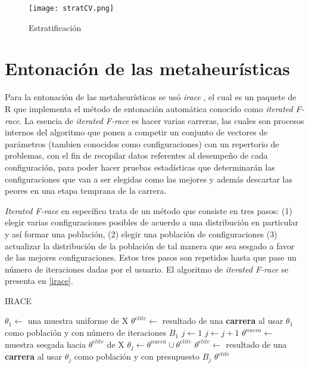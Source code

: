 \begin{figure}[]
\centering
\texttt{[image: stratCV.png]}
\caption[Estratificación]{Estratificación}
\label{strat}
\end{figure}

\section{Entonación de las metaheurísticas}

Para la entonación de las metaheurísticas se usó \emph{irace} \cite{lopez2016irace}, el cual es un paquete de R que implementa el método de entonación automática conocido como \emph{iterated F-race}. La esencia de \emph{iterated F-race}
es hacer varias carreras, las cuales son procesos internos del algoritmo que ponen a competir un conjunto de vectores de parámetros (tambien conocidos como configuraciones) con un repertorio de problemas, con el fin de recopilar datos referentes al desempeño de cada configuración, para poder hacer pruebas estadísticas que determinarán las configuraciones que van a ser elegidas como las mejores y además descartar las peores en una etapa temprana de la carrera. 

\emph{Iterated F-race} en específico trata de un método que consiste en tres pasos: (1) elegir varias configuraciones posibles de acuerdo a una distribución en particular y así formar una población, (2) elegir una población de configuraciones (3) actualizar la distribución de la población de tal manera que sea sesgado a favor de las mejores configuraciones. Estos tres pasos son repetidos hasta que pase un número de iteraciones dadas por el usuario. El algoritmo de \emph{iterated F-race} se presenta en \ref{irace}.

\begin{algorithm}
\caption{IRACE}
\label{irace}
\begin{algorithmic}[1]


\State $\theta_1 \gets$ una muestra uniforme de X
\State $\theta^{elite} \gets$ resultado de una \textbf{carrera} al usar $\theta_1$ como población y con número de iteraciones $B_1$
\State $j \gets 1$
	\State $j \gets j + 1$
	\State $\theta^{nueva} \gets$ muestra sesgada hacia $\theta^{elite}$ de X 
	\State $\theta_j \gets \theta^{nueva} \cup \theta^{elite}$
	\State $\theta^{elite} \gets$ resultado de una \textbf{carrera} al usar $\theta_j$ como población y con presupuesto $B_j$
\EndWhile
\State \Return $\theta^{elite}$

\end{algorithmic}
\end{algorithm}

